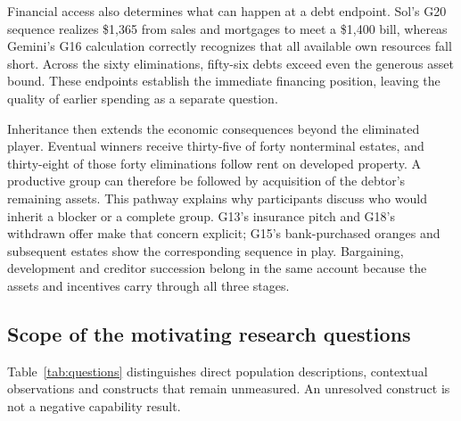 Financial access also determines what can happen at a debt endpoint. Sol's G20 sequence realizes \$1,365 from sales and mortgages to meet a \$1,400 bill, whereas Gemini's G16 calculation correctly recognizes that all available own resources fall short. Across the sixty eliminations, fifty-six debts exceed even the generous asset bound. These endpoints establish the immediate financing position, leaving the quality of earlier spending as a separate question.

Inheritance then extends the economic consequences beyond the eliminated player. Eventual winners receive thirty-five of forty nonterminal estates, and thirty-eight of those forty eliminations follow rent on developed property. A productive group can therefore be followed by acquisition of the debtor's remaining assets. This pathway explains why participants discuss who would inherit a blocker or a complete group. G13's insurance pitch and G18's withdrawn offer make that concern explicit; G15's bank-purchased oranges and subsequent estates show the corresponding sequence in play. Bargaining, development and creditor succession belong in the same account because the assets and incentives carry through all three stages.

\subsection{Scope of the motivating research questions}

Table~\ref{tab:questions} distinguishes direct population descriptions, contextual observations and constructs that remain unmeasured. An unresolved construct is not a negative capability result.

